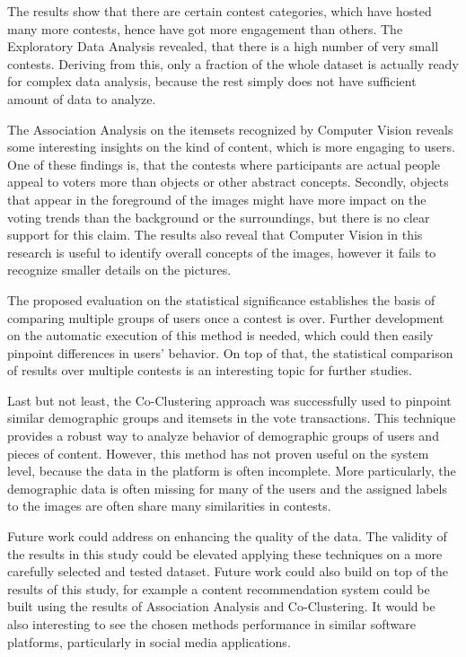 The results show that there are certain contest categories, which have hosted many more contests, hence have got more engagement than others. The Exploratory Data Analysis revealed, that there is a high number of very small contests. Deriving from this, only a fraction of the whole dataset is actually ready for complex data analysis, because the rest simply does not have sufficient amount of data to analyze. 

The Association Analysis on the itemsets recognized by Computer Vision reveals some interesting insights on the kind of content, which is more engaging to users. One of these findings is, that the contests where participants are actual people appeal to voters more than objects or other abstract concepts. Secondly, objects that appear in the foreground of the images might have more impact on the voting trends than the background or the surroundings, but there is no clear support for this claim. The results also reveal that Computer Vision in this research is useful to identify overall concepts of the images, however it fails to recognize smaller details on the pictures. 

The proposed evaluation on the statistical significance establishes the basis of comparing multiple groups of users once a contest is over. Further development on the automatic execution of this method is needed, which could then easily pinpoint differences in users' behavior. On top of that, the statistical comparison of results over multiple contests is an interesting topic for further studies.

Last but not least, the Co-Clustering approach was successfully used to pinpoint similar demographic groups and itemsets in the vote transactions. This technique provides a robust way to analyze behavior of demographic groups of users and pieces of content. However, this method has not proven useful on the system level, because the data in the platform is often incomplete. More particularly, the demographic data is often missing for many of the users and the assigned labels to the images are often share many similarities in contests. 

Future work could address on enhancing the quality of the data. The validity of the results in this study could be elevated applying these techniques on a more carefully selected and tested dataset. Future work could also build on top of the results of this study, for example a content recommendation system could be built using the results of Association Analysis and Co-Clustering. It would be also interesting to see the chosen methods performance in similar software platforms, particularly in social media applications. 

